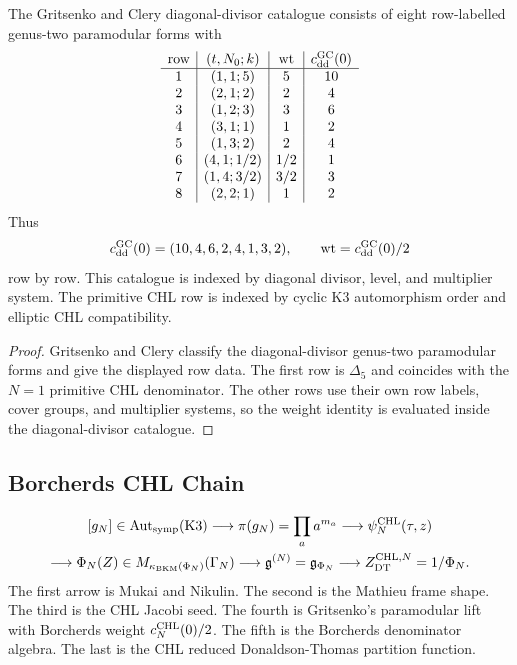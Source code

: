 \begin{theorem}
\label{wn:thm:gritsenko-clery-dd-catalogue}
The Gritsenko and Clery diagonal-divisor catalogue consists of eight
row-labelled genus-two paramodular forms with
\[
\begin{array}{c|c|c|c}
\text{row} & (t,N_0;k) & \operatorname{wt} & c_{\mathrm{dd}}^{\mathrm{GC}}(0)\\
\hline
1 & (1,1;5) & 5 & 10\\
2 & (2,1;2) & 2 & 4\\
3 & (1,2;3) & 3 & 6\\
4 & (3,1;1) & 1 & 2\\
5 & (1,3;2) & 2 & 4\\
6 & (4,1;1/2) & 1/2 & 1\\
7 & (1,4;3/2) & 3/2 & 3\\
8 & (2,2;1) & 1 & 2
\end{array}
\]
Thus
\[
  c_{\mathrm{dd}}^{\mathrm{GC}}(0)=(10,4,6,2,4,1,3,2),\qquad
  \operatorname{wt}=c_{\mathrm{dd}}^{\mathrm{GC}}(0)/2
\]
row by row.  This catalogue is indexed by diagonal divisor, level, and
multiplier system.  The primitive CHL row is indexed by cyclic K3
automorphism order and elliptic CHL compatibility.
\end{theorem}
\begin{proof}
Gritsenko and Clery classify the diagonal-divisor genus-two paramodular
forms and give the displayed row data.  The first row is $\Delta_5$ and
coincides with the $N=1$ primitive CHL denominator.  The other rows use
their own row labels, cover groups, and multiplier systems, so the
weight identity is evaluated inside the diagonal-divisor catalogue.
\end{proof}

\subsection*{Borcherds CHL Chain}

\[
\begin{gathered}
[g_N]\in\Aut_{\symp}(\K)
\longrightarrow
\pi(g_N)=\prod_a a^{m_a}
\longrightarrow
\psi_N^{\CHL}(\tau,z)\\
\longrightarrow
\Phi_N(Z)\in M_{\kBKM(\Phi_N)}(\Gamma_N)
\longrightarrow
\mathfrak g^{(N)}=\mathfrak g_{\Phi_N}
\longrightarrow
Z_{\DT}^{\CHL,N}=1/\Phi_N.
\end{gathered}
\]
The first arrow is Mukai and Nikulin.  The second is the Mathieu frame
shape.  The third is the CHL Jacobi seed.  The fourth is Gritsenko's
paramodular lift with Borcherds weight $c_N^{\mathrm{CHL}}(0)/2$.  The fifth is
the Borcherds denominator algebra.  The last is the CHL reduced
Donaldson-Thomas partition function.

